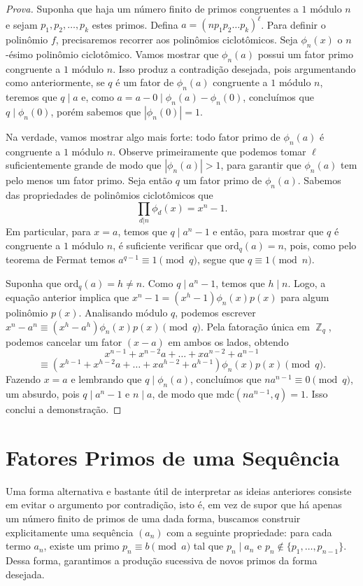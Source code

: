 \documentclass{hipatia}
\DeclareMathOperator{\Z}{\mathbb{Z}}
\begin{document}
\begin{proof}[Prova]
Suponha que haja um número finito de primos congruentes a $1$ módulo $n$ e sejam $p_1, p_2, \ldots, p_k$ estes primos. Defina $a=(np_1p_2\ldots p_k)^{\ell}$. Para definir o polinômio $f$, precisaremos recorrer aos polinômios ciclotômicos. Seja $\phi_n(x)$ o $n$-ésimo polinômio ciclotômico. Vamos mostrar que $\phi_n(a)$ possui um fator primo congruente a $1$ módulo $n$. Isso produz a contradição desejada, pois argumentando como anteriormente, se $q$ é um fator de $\phi_n(a)$ congruente a $1$ módulo $n$, teremos que $q \mid a$ e, como $a = a - 0 \mid \phi_n(a) - \phi_n(0)$, concluímos que $q \mid \phi_n(0)$, porém sabemos que $|\phi_n(0)|=1$.

Na verdade, vamos mostrar algo mais forte: todo fator primo de $\phi_n(a)$ é congruente a $1$ módulo $n$. Observe primeiramente que podemos tomar $\ell$ suficientemente grande de modo que $|\phi_n(a)|>1$, para garantir que $\phi_n(a)$ tem pelo menos um fator primo. Seja então $q$ um fator primo de $\phi_n(a)$. Sabemos das propriedades de polinômios ciclotômicos que \[\prod_{d|n}\phi_d(x) = x^n - 1.\]
Em particular, para $x=a$, temos que $q \mid a^n - 1$ e então, para mostrar que $q$ é congruente a $1$ módulo $n$, é suficiente verificar que $\text{ord}_q(a)=n$, pois, como pelo teorema de Fermat temos $a^{q-1} \equiv 1\pmod{q}$, segue que $q \equiv 1 \pmod n$.

Suponha que $\text{ord}_q(a)=h \ne n$. Como $q\mid a^n - 1$, temos que $h \mid n$. Logo, a equação anterior implica que $x^n - 1=(x^h - 1)\phi_n(x)p(x)$ para algum polinômio $p(x)$. Analisando módulo $q$, podemos escrever $x^n - a^n \equiv (x^h - a^h)\phi_n(x)p(x) \pmod{q}$. Pela fatoração única em $\Z_q$, podemos cancelar um fator $(x-a)$ em ambos os lados, obtendo
\[x^{n-1}+x^{n-2}a+\ldots+xa^{n-2}+a^{n-1} \]
\[\equiv (x^{h-1}+x^{h-2}a+\ldots+xa^{h-2}+a^{h-1})\phi_n(x)p(x) \pmod{q}.\]
Fazendo $x=a$ e lembrando que $q \mid \phi_n(a)$, concluímos que $na^{n-1} \equiv 0 \pmod{q}$, um absurdo, pois $q \mid a^n - 1$ e $n \mid a$, de modo que $\text{mdc}(na^{n-1},q)=1$. Isso conclui a demonstração.
\end{proof}

\section{Fatores Primos de uma Sequência}

Uma forma alternativa e bastante útil de interpretar as ideias anteriores consiste em evitar o argumento por contradição, isto é, em vez de supor que há apenas um número finito de primos de uma dada forma, buscamos construir explicitamente uma sequência $(a_n)$ com a seguinte propriedade: para cada termo $a_n$, existe um primo $p_n \equiv b \pmod{a}$ tal que $p_n \mid a_n$ e $p_n \notin \{p_1,\ldots,p_{n-1}\}$. Dessa forma, garantimos a produção sucessiva de novos primos da forma desejada.
\end{document}
